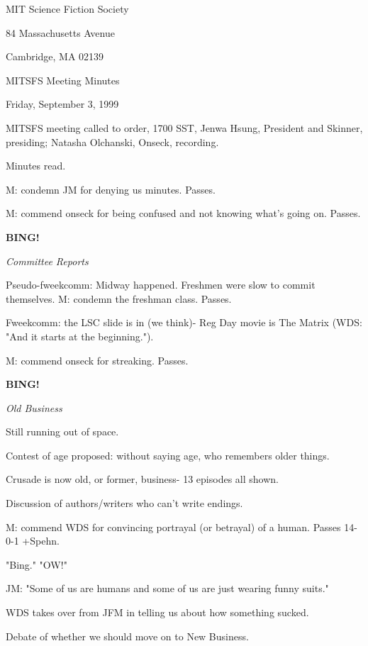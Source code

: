 \documentclass[12pt]{article}
\newcommand{\bing}{{\bf BING!} }
\newcommand{\goto}[1]{\bing \vskip 12pt \centerline{{\em{#1}}}}
\begin{document}
\begin{center}

MIT Science Fiction Society 

84 Massachusetts Avenue

Cambridge, MA 02139

\vspace{12pt}

MITSFS Meeting Minutes 

Friday, September 3, 1999

\end{center}
 
\vspace{18pt}

\setlength{\parskip}{6pt}

\noindent
MITSFS meeting called to order, 1700 SST,
Jenwa Hsung, President and Skinner, presiding; Natasha Olchanski, Onseck, recording.

Minutes read.

M: condemn JM for denying us minutes. Passes.

M: commend onseck for being confused and not knowing what's going on. Passes.

\goto{Committee Reports}

Pseudo-fweekcomm: Midway happened. Freshmen were slow to commit themselves. M: condemn the freshman class. Passes.

Fweekcomm: the LSC slide is in (we think)- Reg Day movie is The Matrix (WDS: "And it starts at the beginning.").

M: commend onseck for streaking. Passes.

\goto{Old Business}

Still running out of space.

Contest of age proposed: without saying age, who remembers older things.

Crusade is now old, or former, business- 13 episodes all shown.

Discussion of authors/writers who can't write endings.

M: commend WDS for convincing portrayal (or betrayal) of a human. Passes 14-0-1 +Spehn.

"Bing." "OW!"

JM: "Some of us are humans and some of us are just wearing funny suits."

WDS takes over from JFM in telling us about how something sucked.

Debate of whether we should move on to New Business.
\end{document}
